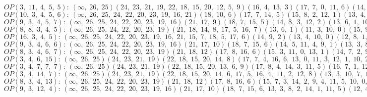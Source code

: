 $OP(3, \;11, \;4, \;5, \;5): \:(\infty, \;26, \;25)(24, \;23, \;21, \;19, \;22, \;18, \;15, \;20, \;12, \;5, \;9)(16, \;4, \;13, \;3)(17, \;7, \;0, \;11, \;6)(14, \;8, \;2, \;10, \;1)$\\
$OP(10, \;3, \;4, \;5, \;6): \:(\infty, \;26, \;25, \;24, \;22, \;20, \;23, \;19, \;16, \;21)(18, \;10, \;6)(17, \;7, \;14, \;5)(15, \;8, \;2, \;12, \;1)(13, \;4, \;9, \;3, \;11, \;0)$\\
$OP(9, \;3, \;4, \;5, \;7): \:(\infty, \;26, \;25, \;24, \;22, \;20, \;23, \;19, \;16)(21, \;17, \;9)(18, \;7, \;15, \;5)(14, \;8, \;3, \;12, \;2)(13, \;6, \;1, \;10, \;4, \;11, \;0)$\\
$OP(8, \;8, \;3, \;4, \;5): \:(\infty, \;26, \;25, \;24, \;22, \;20, \;23, \;19)(21, \;18, \;14, \;8, \;17, \;5, \;16, \;7)(13, \;6, \;1)(11, \;3, \;10, \;0)(15, \;9, \;4, \;12, \;2)$\\
$OP(16, \;3, \;4, \;5): \:(\infty, \;26, \;25, \;24, \;22, \;20, \;23, \;19, \;16, \;21, \;15, \;7, \;18, \;5, \;17, \;6)(14, \;9, \;2)(13, \;4, \;10, \;0)(12, \;8, \;1, \;11, \;3)$\\
$OP(9, \;3, \;4, \;6, \;6): \:(\infty, \;26, \;25, \;24, \;22, \;20, \;23, \;19, \;16)(21, \;17, \;10)(18, \;7, \;15, \;6)(14, \;5, \;11, \;4, \;9, \;1)(13, \;3, \;8, \;2, \;12, \;0)$\\
$OP(8, \;3, \;4, \;6, \;7): \:(\infty, \;26, \;25, \;24, \;22, \;20, \;23, \;19)(21, \;18, \;12)(17, \;8, \;16, \;6)(15, \;3, \;11, \;0, \;13, \;1)(14, \;7, \;2, \;9, \;5, \;10, \;4)$\\
$OP(3, \;4, \;6, \;15): \:(\infty, \;26, \;25)(24, \;23, \;21, \;19)(22, \;18, \;15, \;20, \;14, \;8)(17, \;7, \;4, \;16, \;6, \;13, \;0, \;11, \;3, \;12, \;1, \;10, \;2, \;9, \;5)$\\
$OP(3, \;4, \;7, \;7, \;7): \:(\infty, \;26, \;25)(24, \;23, \;21, \;19)(22, \;18, \;15, \;20, \;13, \;6, \;9)(17, \;8, \;4, \;14, \;3, \;11, \;5)(16, \;7, \;1, \;12, \;0, \;10, \;2)$\\
$OP(3, \;4, \;14, \;7): \:(\infty, \;26, \;25)(24, \;23, \;21, \;19)(22, \;18, \;15, \;20, \;14, \;6, \;17, \;5, \;16, \;4, \;11, \;2, \;12, \;8)(13, \;3, \;10, \;7, \;1, \;9, \;0)$\\
$OP(8, \;3, \;4, \;13): \:(\infty, \;26, \;25, \;24, \;22, \;20, \;23, \;19)(21, \;18, \;12)(17, \;8, \;16, \;6)(15, \;7, \;3, \;14, \;2, \;9, \;4, \;11, \;5, \;10, \;0, \;13, \;1)$\\
$OP(9, \;3, \;12, \;4): \:(\infty, \;26, \;25, \;24, \;22, \;20, \;23, \;19, \;16)(21, \;17, \;10)(18, \;7, \;15, \;6, \;13, \;3, \;8, \;2, \;14, \;1, \;11, \;5)(12, \;4, \;9, \;0)$\\
